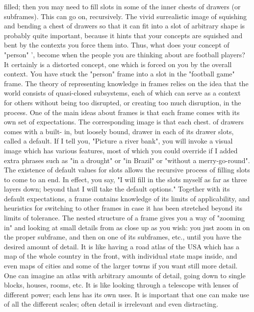 filled; then you may need to fill slots in some of the inner chests of drawers (or
subframes). This can go on, recursively.
         The vivid surrealistic image of squishing and bending a chest of drawers so that it
can fit into a slot of arbitrary shape is probably quite important, because it hints that your
concepts are squished and bent by the contexts you force them into. Thus, what does your
concept of "person" ', become when the people you are thinking about are football
players? It certainly is a distorted concept, one which is forced on you by the overall
context. You have stuck the "person" frame into a slot in the "football game" frame. The
theory of representing knowledge in frames relies on the idea that the world consists of
quasi-closed subsystems, each of which can serve as a context for others without being
too disrupted, or creating too much disruption, in the process.
         One of the main ideas about frames is that each frame comes with its own set of
expectations. The corresponding image is that each chest. of drawers comes with a built-
in, but loosely bound, drawer in each of its
drawer slots, called a default. If I tell you, "Picture a river bank", you will invoke a visual
image which has various features, most of which you could override if I added extra
phrases such as "in a drought" or "in Brazil" or "without a merry-go-round". The
existence of default values for slots allows the recursive process of filling slots to come to
an end. In effect, you say, "I will fill in the slots myself as far as three layers down;
beyond that I will take the default options." Together with its default expectations, a
frame contains knowledge of its limits of applicability, and heuristics for switching to
other frames in case it has been stretched beyond its limits of tolerance.
         The nested structure of a frame gives you a way of "zooming in" and looking at
small details from as close up as you wish: you just zoom in on the proper subframe, and
then on one of its subframes, etc., until you have the desired amount of detail. It is like
having a road atlas of the USA which has a map of the whole country in the front, with
individual state maps inside, and even maps of cities and some of the larger towns if you
want still more detail. One can imagine an atlas with arbitrary amounts of detail, going
down to single blocks, houses, rooms, etc. It is like looking through a telescope with
lenses of different power; each lens has its own uses. It is important that one can make
use of all the different scales; often detail is irrelevant and even distracting.
